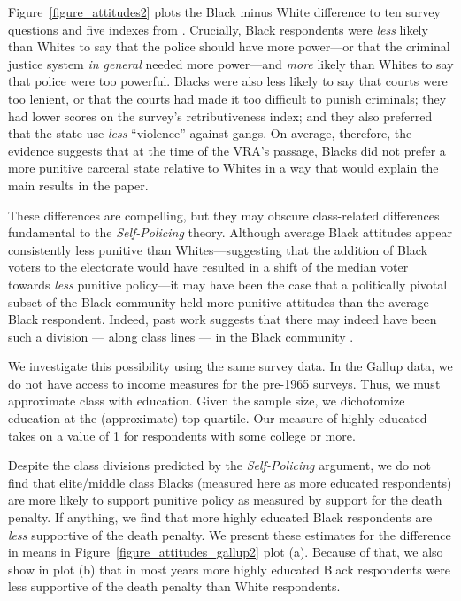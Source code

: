 \documentclass[12pt]{article}
\begin{document}
Figure~\ref{figure_attitudes2} plots the Black minus White difference to ten survey questions and five indexes from .  Crucially, Black respondents were \emph{less} likely than Whites to say that the police should have more power---or that the criminal justice system \emph{in general} needed more power---and \emph{more} likely than Whites to say that police were too powerful.  Blacks were also less likely to say that courts were too lenient, or that the courts had made it too difficult to punish criminals; they had lower scores on the survey's retributiveness index; and they also preferred that the state use \emph{less} ``violence'' against gangs.  On average, therefore, the evidence suggests that at the time of the VRA's passage, Blacks did not prefer a more punitive carceral state relative to Whites in a way that would explain the main results in the paper.

These differences are compelling, but they may obscure class-related differences fundamental to the \emph{Self-Policing} theory.  Although average Black attitudes appear consistently less punitive than Whites---suggesting that the addition of Black voters to the electorate would have resulted in a shift of the median voter towards \emph{less} punitive policy---it may have been the case that a politically pivotal subset of the Black community held more punitive attitudes than the average Black respondent.  Indeed, past work suggests that there may indeed have been such a division --- along class lines --- in the Black community .

We investigate this possibility using the same survey data.  In the Gallup data, we do not have access to income measures for the pre-1965 surveys.  Thus, we must approximate class with education.  Given the sample size, we dichotomize education at the (approximate) top quartile.  Our measure of highly educated takes on a value of 1 for respondents with some college or more.

Despite the class divisions predicted by the \emph{Self-Policing} argument, we do not find that elite/middle class Blacks (measured here as more educated respondents) are more likely to support punitive policy as measured by support for the death penalty.  If anything, we find that more highly educated Black respondents are \emph{less} supportive of the death penalty.  We present these estimates for the difference in means in Figure~\ref{figure_attitudes_gallup2} plot (a).  Because of that, we also show in plot (b) that in most years more highly educated Black respondents were less supportive of the death penalty than White respondents.
\end{document}
